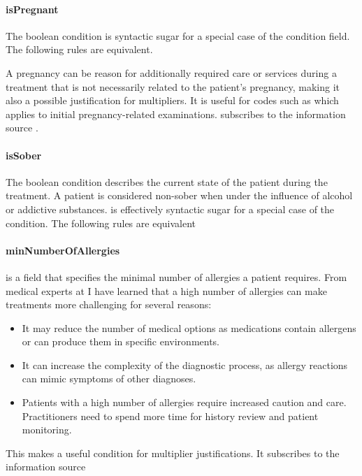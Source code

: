 \paragraph{isPregnant}
The \isPregnant boolean condition is syntactic sugar for a special case of the \anamnesisBlocks condition field.
The following rules are equivalent.

A pregnancy can be reason for additionally required care or services during a treatment that is not necessarily related to the patient's pregnancy,
making it also a possible justification for multipliers.
It is useful for codes such as  which applies to initial pregnancy-related examinations.
 subscribes to the information source .

\paragraph{isSober}
The \isSober boolean condition describes the current state of the patient during the treatment.
A patient is considered non-sober when under the influence of alcohol or addictive substances.
\isSober is effectively syntactic sugar for a special case of the \anamnesisBlocks condition.
The following rules are equivalent



\paragraph{minNumberOfAllergies}
\minNumberOfAllergies is a field that specifies the minimal number of allergies a patient requires.
From medical experts at \AV I have learned that a high number of allergies can make treatments more challenging for several reasons:
\begin{itemize}
    \item It may reduce the number of medical options as medications contain allergens or can produce them in specific environments.
    \item It can increase the complexity of the diagnostic process, as allergy reactions can mimic symptoms of other diagnoses.
    \item Patients with a high number of allergies require increased caution and care.
    Practitioners need to spend more time for history review and patient monitoring.
\end{itemize}
This makes \minNumberOfAllergies a useful condition for multiplier justifications.
It subscribes to the information source 

